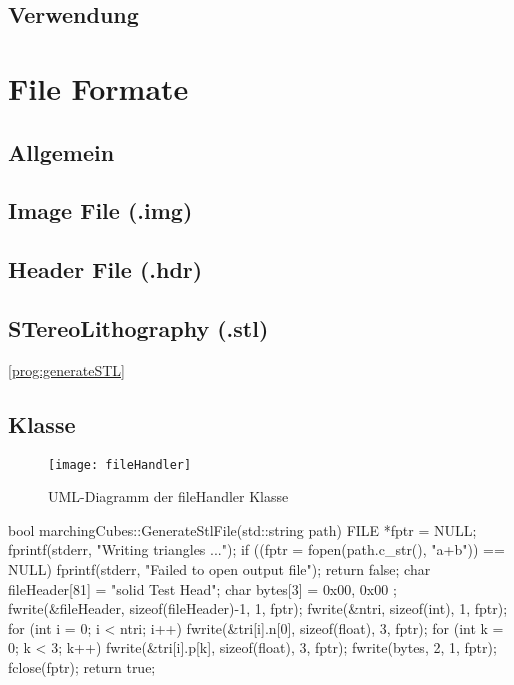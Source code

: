 \subsection{Verwendung}


\section{File Formate}

\subsection{Allgemein}
\subsection{Image File (.img)}

\subsection{Header File (.hdr)}

\subsection{STereoLithography (.stl)}
\ref{prog:generateSTL}
\subsection{Klasse}
\begin{figure}[H]
	\centering
	\texttt{[image: fileHandler]}
	\caption{UML-Diagramm der fileHandler Klasse}
	\label{fig:fileHandler}
\end{figure}
\begin{program}
	\caption{Generierung einer STL-Datei}
	\label{prog:generateSTL}
	\begin{CCode}
	bool marchingCubes::GenerateStlFile(std::string path){
		FILE *fptr = NULL;
		fprintf(stderr, "Writing triangles ...\n");
		if ((fptr = fopen(path.c_str(), "a+b")) == NULL) {
			fprintf(stderr, "Failed to open output file\n");
			return false;
		}
		char fileHeader[81] = "solid Test Head";
		char bytes[3] = { 0x00, 0x00 };
		fwrite(&fileHeader, sizeof(fileHeader)-1, 1, fptr);
		fwrite(&ntri, sizeof(int), 1, fptr);
		for (int i = 0; i < ntri; i++) {
			fwrite(&tri[i].n[0], sizeof(float), 3, fptr);
			for (int k = 0; k < 3; k++)  {
				fwrite(&tri[i].p[k], sizeof(float), 3, fptr);
			}
			fwrite(bytes, 2, 1, fptr);
		}
		fclose(fptr);
		return true;
	}
	\end{CCode}
\end{program}

